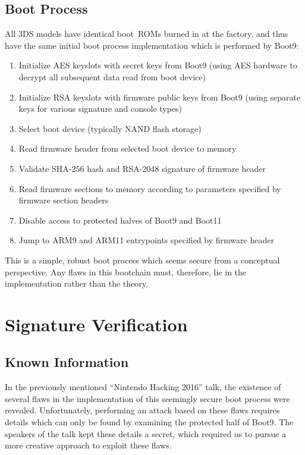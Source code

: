 \documentclass[journal]{IEEEtran}
\begin{document}
\subsection{Boot Process}

All 3DS models have identical boot~ROMs burned in at the factory, and thus have
the same initial boot process implementation which is performed by
Boot9\cite{bootloader}\cite{33c3}:

\medskip
\begin{enumerate}
  \item Initialize AES keyslots with secret keys from Boot9 (using AES hardware
  to decrypt all subsequent data read from boot device)
  \item Initialize RSA keyslots with firmware public keys from Boot9 (using
  separate keys for various signature and console types)
  \item Select boot device (typically NAND flash storage)
  \item Read firmware header from selected boot device to memory
  \item Validate SHA-256 hash and RSA-2048 signature of firmware header
  \item Read firmware sections to memory according to parameters specified by
  firmware section headers
  \item Disable access to protected halves of Boot9 and Boot11
  \item Jump to ARM9 and ARM11 entrypoints specified by firmware header
\end{enumerate}
\medskip

This is a simple, robust boot process which seems secure from a conceptual
perspective. Any flaws in this bootchain must, therefore, lie in the
implementation rather than the theory.

\section{Signature Verification}

\subsection{Known Information}

In the previously mentioned ``Nintendo Hacking 2016'' talk, the existence of
several flaws in the implementation of this seemingly secure boot process were
revealed\cite{33c3}. Unfortunately, performing an attack based on these flaws
requires details which can only be found by examining the protected half of
Boot9. The speakers of the talk kept these details a secret, which required us
to pursue a more creative approach to exploit these flaws.
\end{document}
